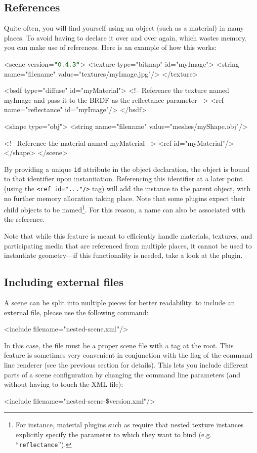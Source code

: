 \subsection{References}
Quite often, you will find yourself using an object (such as a material) in many places. To avoid having
to declare it over and over again, which wastes memory, you can make use of references. Here is an example
of how this works:
\begin{xml}
<scene version=$\MtsVer$>
	<texture type="bitmap" id="myImage">
		<string name="filename" value="textures/myImage.jpg"/>
	</texture>

	<bsdf type="diffuse" id="myMaterial">
		<!-- Reference the texture named myImage and pass it
			to the BRDF as the reflectance parameter -->
		<ref name="reflectance" id="myImage"/>
	</bsdf>

	<shape type="obj">
		<string name="filename" value="meshes/myShape.obj"/>

		<!-- Reference the material named myMaterial -->
		<ref id="myMaterial"/>
	</shape>
</scene>
\end{xml}
By providing a unique \texttt{id} attribute in the
object declaration, the object is bound to that identifier
upon instantiation.
Referencing this identifier at a later point (using the \texttt{<ref id="..."/>} tag)
will add the instance to the parent object, with no further memory
allocation taking place. Note that some plugins expect their child objects
to be named\footnote{For instance, material plugins such as  require that
nested texture instances explicitly specify the parameter to which they want to bind (e.g. ``\texttt{reflectance}'').}.
For this reason, a name can also be associated with the reference.

Note that while this feature is meant to efficiently handle materials,
textures, and participating media that are referenced from multiple places,
it cannot be used to instantiate geometry---if this functionality is needed,
take a look at the  plugin.

\subsection{Including external files}
A scene can be split into multiple pieces for better readability.
to include an external file, please use the following command:
\begin{xml}
<include filename="nested-scene.xml"/>
\end{xml}
In this case, the file  must be a proper scene file with a  tag at the root.
This feature is sometimes very convenient in conjunction with the  flag of the  command line renderer (see the previous section for details).
This lets you include different parts of a scene configuration by changing the command line parameters (and without having to touch the XML file):
\begin{xml}
<include filename="nested-scene-$\texttt{\$}$version.xml"/>
\end{xml}
